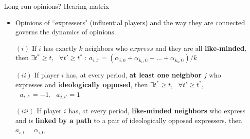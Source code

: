 \documentclass[xcolor=table,handout]{beamer}
\begin{document}
\begin{frame}{Long-run opinions? Hearing matrix}

\begin{itemize}\setlength\itemsep{1em}
	\item Opinions of ``expressers" (influential players) and the way they are connected governs the dynamics of opinions...
\end{itemize}
\begin{tcolorbox}[enhanced,attach boxed title to top center={yshift=-3mm,yshifttext=-1mm}, colback=red!3,colframe=red!40,colbacktitle=red!40, title=Proposition ,fonttitle=\bfseries, boxed title style={size=small,colframe=red!50} ] 

\begin{itemize}
\setlength\itemsep{1em}
	\item[$(i)$]  If $i$ has exactly $k$ neighbors who $express$ and they are all {\bf\color{purple}like-minded}, then $\exists t^* \geq t, \mbox{ }\forall t' \geq t^* $ :
	$ a_{i,t'} = ({\alpha_{i,0} + \alpha_{k_1,0}  + \ldots + \alpha_{k_k,0} })/{k}$
	\item[$(ii)$]  If player $i$ has, at every period, {\bf\color{purple}at least one neighbor} $j$ who expresses and {\bf\color{purple}ideologically opposed}, then $ \exists t^{*} \geq t, \mbox{ }\forall t' \geq t^{*},$ $ \mbox{ } a_{i,t'} = -1, \mbox{ }a_{j,t'} = 1$
	\item[$(iii)$]  If player $i$ has, at every period, {\bf\color{purple}like-minded neighbors} who express and is {\bf\color{purple}linked by a path} to a pair of ideologically opposed expressers, then  $a_{i,t} = \alpha_{i,0}$
\end{itemize}
\end{tcolorbox}
\end{frame}
%
\end{document}
